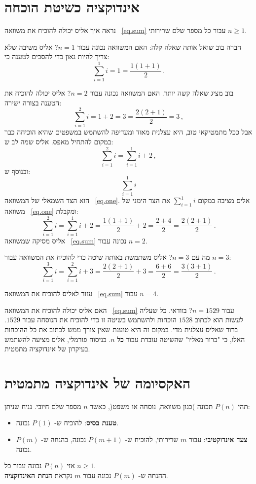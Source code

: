 \section{%
אינדוקציה כשיטת הוכחה
}\label{s.rule}

נראה איך אליס יכולה להוכיח את משוואה~%
\ref{eq.sum}
עבור כל מספר שלם שרירותי
$n\geq 1$.

חברה בוב שואל אותה שאלה קלה: האם המשוואה נכונה עבור
$n=1$?
אליס משיבה שלא צריך להיות גאון כדי להסכים לטענה כי:
\begin{equation}
\sum_{i=1}^1 i = 1 = \frac{1(1+1)}{2}\,.\label{eq.one}
\end{equation}

בוב מציג שאלה קשה יותר. האם המשוואה נכונה עבור
$n=2$?
אליס יכולה להוכיח את הטענה בצורה ישירה:
\[
\sum_{i=1}^2 i = 1 + 2 = 3 = \frac{2(2+1)}{2}=3\,,
\]
אבל ככל מתמטיקאי טוב, היא עצלנית מאוד ומעדיפה להשתמש במשפטים שהיא הוכיחה כבר במקום להתחיל מאפס. אליס שמה לב ש:
\[
\sum_{i=1}^2 i = \sum_{i=1}^1 i + 2\,,
\]
ובנוסף ש:
\[
\sum_{i=1}^1 i
\]
הוא הצד השמאלי של המשוואה~%
\ref{eq.one}.
אליס מציבה במקום
$\sum_{i=1}^1 i$
את הצד הימני של משוואה~%
\ref{eq.one}
ומקבלת:
\[
\sum_{i=1}^2 i = \sum_{i=1}^1 i +2 = \frac{1(1+1)}{2} + 2 = \frac{2 + 4}{2} = \frac{2(2+1)}{2}\,.
\]
אליס מסיקה שמשוואה~%
\ref{eq.sum}
נכונה עבור
$n=2$.

מה עם
$n=3$?
אליס משתמשת באותה שיטה כדי להוכיח את המשוואה עבור
$n=3$:
\[
\sum_{i=1}^3 i = \sum_{i=1}^2 i + 3 = \frac{2(2+1)}{2} + 3 = \frac{6+6}{2} = \frac{3(3+1)}{2}\,.
\]

\begin{exercise}
עזור לאליס להוכיח את המשוואה~%
\ref{eq.sum}
עבור
$n=4$.
\end{exercise}

האם אליס יכולה להוכיח את המשוואה~%
\ref{eq.sum}
עבור
$n=1529$?
בוודאי. כל שעליה לעשות הוא לכתוב
$1528$
הוכחות ולהשתמש בשיטה זו כדי להוכיח את הנוסחה עבור
$1529$.
ברור שאליס עצלנית מדי. במקום זה היא טוענת שאין צורך ממש לכתוב את כל ההוכחות האלו, כי "ברור מאליו" שהשיטה עובדת עבור
\textbf{כל} $n$.
בניסוח פורמלי, אליס מציעה להשתמש בעיקרון של אינדוקציה מתמטית.

\section{%
האקסיומה של אינדוקציה מתמטית%
}\label{s.axiom1}

\begin{axiom}\label{ax.induction}
תהי
$P(n)$
תכונה )כגון משוואה, נוסחה או משפט(, כאשר
$n$
מספר שלם חיובי. נניח שניתן:
\begin{itemize}
\item \textbf{טענת בסיס}:
להוכיח ש-%
$P(1)$
נכונה.
\item \textbf{צעד אינדוקטיבי}:
עבור
$m$
שרירותי, להוכיח ש-%
$P(m+1)$
נכונה, בהנחה ש-%
$P(m)$
נכונה.
\end{itemize}
אזי
$P(n)$
נכונה עבור כל
$n\geq 1$.\\
ההנחה ש-%
$P(m)$
נכונה עבור
$m$
נקראת
\textbf{הנחת האינדוקציה}.
\end{axiom}

